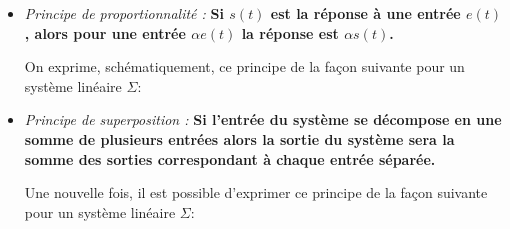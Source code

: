 \begin{itemize}
    \item \emph{Principe de proportionnalité :}
          \textbf{Si $s(t)$ est la réponse à une entrée $e(t)$, alors 
          pour une entrée $\alpha e(t)$ la réponse est $\alpha s(t)$.}
        
    On exprime, schématiquement, ce principe de la façon suivante pour 
    un système linéaire $\Sigma$:
    \begin{center}
    \end{center}


    \item \emph{Principe de superposition :}
     \textbf{Si l'entrée du système se décompose en une somme 
        de plusieurs entrées alors la sortie du système sera la somme des 
        sorties correspondant à chaque entrée séparée.}

    Une nouvelle fois, il est possible d'exprimer ce principe de la façon suivante pour 
    un système linéaire $\Sigma$:
    \begin{center}
    \end{center}


\end{itemize}
